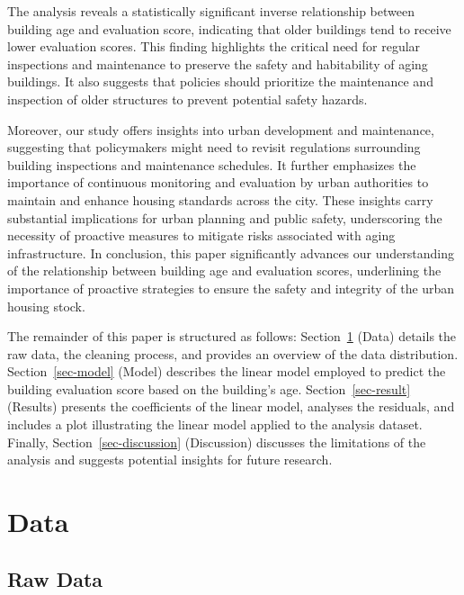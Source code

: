 \documentclass[
  letterpaper,
  DIV=11,
  numbers=noendperiod]{scrartcl}
\begin{document}
The analysis reveals a statistically significant inverse relationship
between building age and evaluation score, indicating that older
buildings tend to receive lower evaluation scores. This finding
highlights the critical need for regular inspections and maintenance to
preserve the safety and habitability of aging buildings. It also
suggests that policies should prioritize the maintenance and inspection
of older structures to prevent potential safety hazards.

Moreover, our study offers insights into urban development and
maintenance, suggesting that policymakers might need to revisit
regulations surrounding building inspections and maintenance schedules.
It further emphasizes the importance of continuous monitoring and
evaluation by urban authorities to maintain and enhance housing
standards across the city. These insights carry substantial implications
for urban planning and public safety, underscoring the necessity of
proactive measures to mitigate risks associated with aging
infrastructure. In conclusion, this paper significantly advances our
understanding of the relationship between building age and evaluation
scores, underlining the importance of proactive strategies to ensure the
safety and integrity of the urban housing stock.

The remainder of this paper is structured as follows:
Section~\ref{sec-data} (Data) details the raw data, the cleaning
process, and provides an overview of the data distribution.
Section~\ref{sec-model} (Model) describes the linear model employed to
predict the building evaluation score based on the building's age.
Section~\ref{sec-result} (Results) presents the coefficients of the
linear model, analyses the residuals, and includes a plot illustrating
the linear model applied to the analysis dataset. Finally,
Section~\ref{sec-discussion} (Discussion) discusses the limitations of
the analysis and suggests potential insights for future research.

\hypertarget{sec-data}{%
\section{Data}\label{sec-data}}

\hypertarget{raw-data}{%
\subsection{Raw Data}\label{raw-data}}
\end{document}
